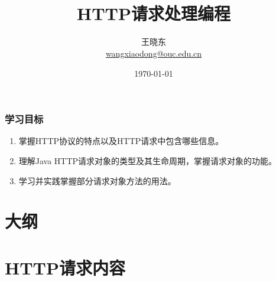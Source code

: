 
\title[KevinW@OUC]{\\  
HTTP请求处理编程}
\author[王晓东]{王晓东\\
  \href{mailto:wangxiaodong@ouc.edu.cn}{\footnotesize wangxiaodong@ouc.edu.cn}}
\date{\today}


 \frame{\titlepage}
\begin{frame}
  \frametitle{学习目标}

  \begin{enumerate}
  \item 掌握HTTP协议的特点以及HTTP请求中包含哪些信息。
  \item 理解Java HTTP请求对象的类型及其生命周期，掌握请求对象的功能。
  \item 学习并实践掌握部分请求对象方法的用法。
  \end{enumerate}  
\end{frame}
 
\section*{大纲}

\section{HTTP请求内容}

